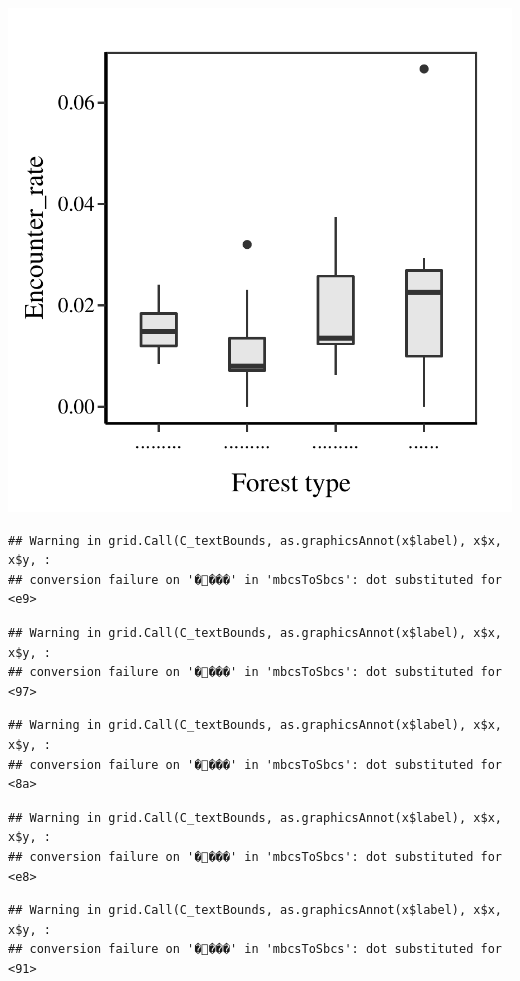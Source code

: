 \documentclass[
]{article}
\begin{document}
\includegraphics{6-data-plot_files/figure-latex/unnamed-chunk-22-1.pdf}

\begin{verbatim}
## Warning in grid.Call(C_textBounds, as.graphicsAnnot(x$label), x$x, x$y, :
## conversion failure on '����' in 'mbcsToSbcs': dot substituted for <e9>
\end{verbatim}

\begin{verbatim}
## Warning in grid.Call(C_textBounds, as.graphicsAnnot(x$label), x$x, x$y, :
## conversion failure on '����' in 'mbcsToSbcs': dot substituted for <97>
\end{verbatim}

\begin{verbatim}
## Warning in grid.Call(C_textBounds, as.graphicsAnnot(x$label), x$x, x$y, :
## conversion failure on '����' in 'mbcsToSbcs': dot substituted for <8a>
\end{verbatim}

\begin{verbatim}
## Warning in grid.Call(C_textBounds, as.graphicsAnnot(x$label), x$x, x$y, :
## conversion failure on '����' in 'mbcsToSbcs': dot substituted for <e8>
\end{verbatim}

\begin{verbatim}
## Warning in grid.Call(C_textBounds, as.graphicsAnnot(x$label), x$x, x$y, :
## conversion failure on '����' in 'mbcsToSbcs': dot substituted for <91>
\end{verbatim}
\end{document}
